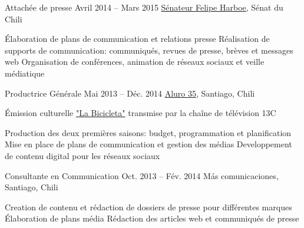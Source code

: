 \begin{joblist}[13.2][7.8][3.4]
{{\begin{itemize}
		\end{itemize}      
        }
	}



\item[Attachée de presse]{Avril 2014 -- Mars 2015}
     {
     \href{https://www.harboe.cl/}{Sénateur Felipe Harboe}, Sénat du Chili
     } 
	 {
        \normalsize{
		\iftbftiny \vspace{-0.5cm} \fi
			\begin{itemize}
			  \iftbftiny \setlength\itemsep{-3pt} \fi
			  \cvitem[\checkmark] Élaboration de plans de communication et relations presse
			  \cvitem[\checkmark] Réalisation de supports de communication: communiqués, revues de presse, brèves et messages web
			  \cvitem[\checkmark] Organisation de conférences, animation de réseaux sociaux et veille médiatique
			\end{itemize}     
		}	
	}
    
    
    
\item[Productrice Générale]{Mai 2013 -- Déc. 2014}
     {
     \href{https://www.aluro35.com/}{Aluro 35}, Santiago, Chili
     }
     {Émission culturelle \href{http://www.13.cl/c/programas/la-bicicleta}{"La Bicicleta"} transmise par la chaîne de télévision 13C \\

        \normalsize{
		\iftbftiny \vspace{-0.5cm} \fi
			\begin{itemize}
			  \iftbftiny \setlength\itemsep{-3pt} \fi
			  \cvitem[\checkmark] Production des deux premières saisons: budget, programmation et planification             
			  \cvitem[\checkmark] Mise en place de plans de communication et gestion des médias
			  \cvitem[\checkmark] Developpement de contenu digital pour les réseaux sociaux
			\end{itemize}     
		}	
	}



\item[Consultante en Communication]{Oct. 2013 -- Fév. 2014 }     
  	{
  	Más comunicaciones, Santiago, Chili
  	}     
  	{
        \normalsize{
		\iftbftiny \vspace{-0.5cm} \fi
		\begin{itemize}
			  \iftbftiny \setlength\itemsep{-3pt} \fi
			  \cvitem[\checkmark]  Creation de contenu et rédaction de dossiers de presse pour différentes marques                                
			  \cvitem[\checkmark]  Élaboration de plans média                                    
			  \cvitem[\checkmark]  Rédaction des articles web et communiqués de presse
			  

\end{itemize}}}
\end{joblist}
